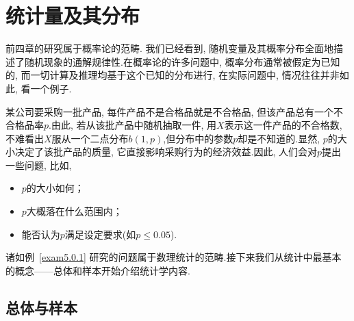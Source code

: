 \chapter{统计量及其分布\label{cha:5}}
前四章的研究属于概率论的范畴. 我们已经看到, 随机变量及其概率分布全面地描述了随机现象的通解规律性.在概率论的许多问题中, 概率分布通常被假定为已知的, 而一切计算及推理均基于这个已知的分布进行, 在实际问题中, 情况往往并非如此, 看一个例子.
\begin{example}\label{exam5.0.1}
某公司要采购一批产品, 每件产品不是合格品就是不合格品, 但该产品总有一个不合格品率$p$.由此, 若从该批产品中随机抽取一件, 用$X$表示这一件产品的不合格数, 不难看出$X$服从一个二点分布$b(1,p)$,但分布中的参数$p$却是不知道的.显然,  $p$的大小决定了该批产品的质量, 它直接影响采购行为的经济效益.因此, 人们会对$p$提出一些问题, 比如,
\begin{itemize}
\item $p$的大小如何；
\item $p$大概落在什么范围内；
\item 能否认为$p$满足设定要求(如$p\leq0.05$).
\end{itemize}
\end{example}
诸如例~\ref{exam5.0.1} 研究的问题属于数理统计的范畴.接下来我们从统计中最基本的概念——总体和样本开始介绍统计学内容.
\section{总体与样本\label{sec:5.1}}
